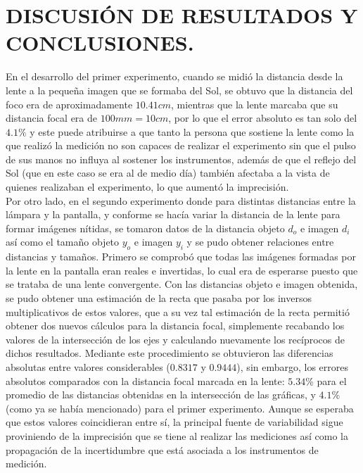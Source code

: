 \documentclass[10pt,a4paper]{article}
\begin{document}

\section{DISCUSIÓN DE RESULTADOS Y CONCLUSIONES.} %
En el desarrollo del primer experimento, cuando se midió la distancia desde la lente a la pequeña imagen que se formaba del Sol, se obtuvo que la distancia del foco era de aproximadamente $10.41 cm$, mientras que la lente marcaba que su distancia focal era de $100mm=10 cm$, por lo que el error absoluto es tan solo del $4.1\%$ y este puede atribuirse a que tanto la persona que sostiene la lente como la que realizó la medición no son capaces de realizar el experimento sin que el pulso de sus manos no influya al sostener los instrumentos, además de que el reflejo del Sol (que en este caso se era al de medio día) también afectaba a la vista de quienes realizaban el experimento, lo que aumentó la imprecisión.  \\[2mm]
Por otro lado, en el segundo experimento donde para distintas distancias entre la lámpara y la pantalla, y conforme se hacía variar la distancia de la lente para formar imágenes nítidas, se tomaron datos de la distancia objeto $d_o$ e imagen $d_i$ así como el tamaño objeto $y_o$ e imagen $y_i$ y se pudo obtener relaciones entre distancias y tamaños. Primero se comprobó que todas las imágenes formadas por la lente en la pantalla eran reales e invertidas, lo cual era de esperarse puesto que se trataba de una lente convergente. Con las distancias objeto e imagen obtenida, se pudo obtener una estimación de la recta que pasaba por los inversos multiplicativos de estos valores, que a su vez tal estimación de la recta permitió obtener dos nuevos cálculos para la distancia focal, simplemente recabando los valores de la intersección de los ejes y calculando nuevamente los recíprocos de dichos resultados. Mediante este procedimiento se obtuvieron las diferencias absolutas entre valores considerables ($0.8317$ y $0.9444$), sin embargo, los errores absolutos comparados con la distancia focal marcada en la lente: $5.34$\textsc{\%} para el promedio de las distancias obtenidas en la intersección de las gráficas, y $4.1$\textsc{\%} (como ya se había mencionado) para el primer experimento. Aunque se esperaba que estos valores coincidieran entre sí, la principal fuente de variabilidad sigue proviniendo de la imprecisión que se tiene al realizar las mediciones así como la propagación de la incertidumbre que está asociada a los instrumentos de medición. \\[2mm]
\end{document}
